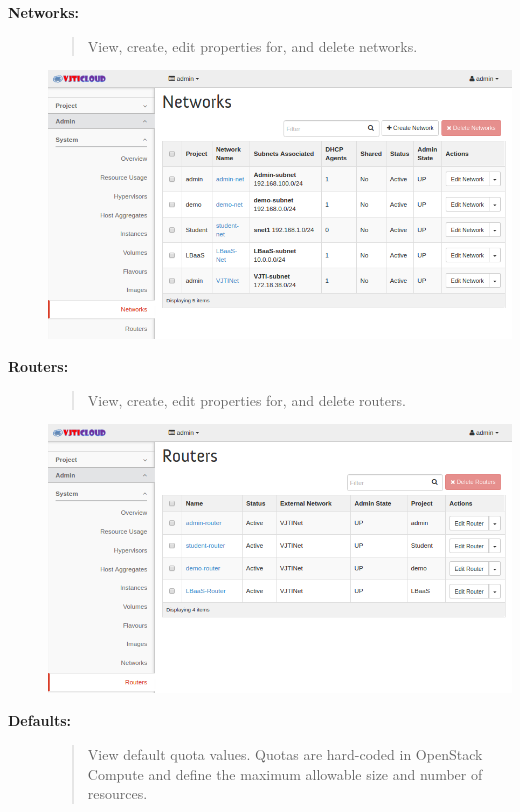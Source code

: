 \documentclass[letterpaper,10pt,english]{sphinxmanual}
\begin{document}
\begin{description}
\item[{\textbf{Networks:}}] \leavevmode\begin{quote}

View, create, edit properties for, and delete networks.
\end{quote}

\includegraphics{sys_networks.png}

\item[{\textbf{Routers:}}] \leavevmode\begin{quote}

View, create, edit properties for, and delete routers.
\end{quote}

\includegraphics{sys_routers.png}

\item[{\textbf{Defaults:}}] \leavevmode\begin{quote}

View default quota values. Quotas are hard-coded in OpenStack Compute and define the maximum allowable size and number of resources.
\end{quote}


\end{description}
\end{document}

